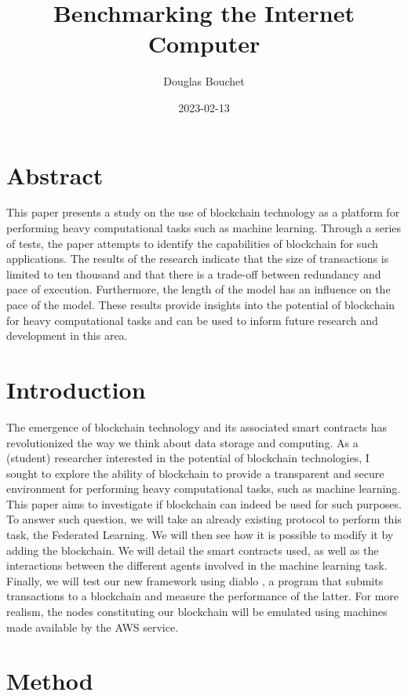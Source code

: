 \documentclass{article}
\title{Benchmarking the Internet Computer}
\date{2023-02-13}
\author{Douglas Bouchet}
\begin{document}
\maketitle
\newpage
{}

\tableofcontents

\newpage
\section{Abstract}
This paper presents a study on the use of blockchain technology as a platform for performing heavy computational tasks
such as machine learning. Through a series of tests, the paper attempts to identify the capabilities of blockchain for
such applications. The results of the research indicate that the size of transactions is limited to ten thousand
and that there is a trade-off between redundancy and pace of execution. Furthermore, the length of the model has an
influence on the pace of the model. These results provide insights into the potential of blockchain for heavy
computational tasks and can be used to inform future research and development in this area.
\newpage
\section{Introduction}
The emergence of blockchain technology and its associated smart contracts has revolutionized the way we think about data
storage and computing. As a (student) researcher interested in the potential of blockchain technologies, I sought to explore the
ability of blockchain to provide a transparent and secure environment for performing heavy computational tasks, such
as machine learning. This paper aims to investigate if blockchain can indeed be used for such purposes.
To answer such question, we will take an already existing protocol to perform this task, the Federated Learning. We will then see how it is possible to modify it by adding the blockchain.
We will detail the smart contracts used, as well as the interactions between the different agents involved in the
machine learning task. Finally, we will test our new framework using diablo \cite{diablo}, a program that submits transactions
to a blockchain and measure the performance of the latter. For more realism,
the nodes constituting our blockchain will be emulated using machines made available by the AWS service.
\section{Method}
\end{document}
